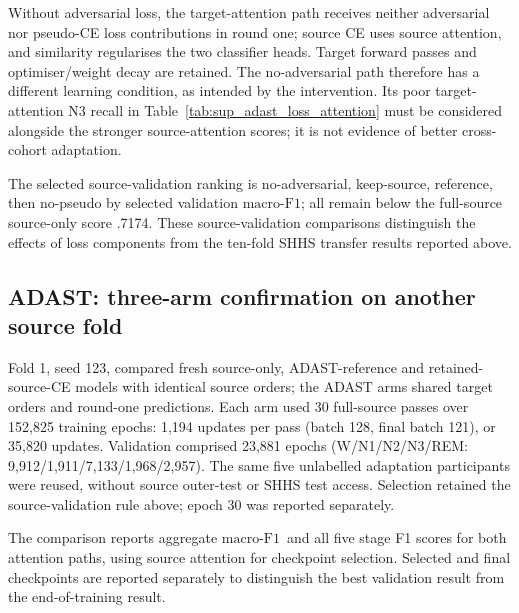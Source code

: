 \documentclass[10pt,a4paper]{article}
\newcommand{\mf}{\ensuremath{\mathrm{macro\text{-}F1}}}
\begin{document}
Without adversarial loss, the target-attention path receives neither adversarial nor pseudo-CE
loss contributions in round one; source CE uses source attention, and similarity regularises
the two classifier heads. Target forward passes and optimiser/weight decay are retained.
The no-adversarial path therefore has a different learning condition, as intended by the
intervention. Its poor target-attention N3 recall in Table~\ref{tab:sup_adast_loss_attention}
must be considered alongside the stronger source-attention scores; it is not evidence of
better cross-cohort adaptation.

The selected source-validation ranking is no-adversarial, keep-source, reference, then no-pseudo by
selected validation \mf; all remain below the full-source source-only score .7174.
These source-validation comparisons distinguish the effects of loss components from
the ten-fold SHHS transfer results reported above.

\subsection*{ADAST: three-arm confirmation on another source fold}

Fold 1, seed 123, compared fresh source-only, ADAST-reference and retained-source-CE
models with identical source orders; the ADAST arms shared target orders and round-one
predictions. Each arm used 30 full-source passes over 152,825 training epochs: 1,194
updates per pass (batch 128, final batch 121), or 35,820 updates. Validation comprised
23,881 epochs (W/N1/N2/N3/REM: 9,912/1,911/7,133/1,968/2,957). The same five unlabelled
adaptation participants were reused, without source outer-test or SHHS test access.
Selection retained the source-validation rule above; epoch 30 was reported separately.

The comparison reports aggregate \mf\ and all five stage F1 scores for both attention
paths, using source attention for checkpoint selection. Selected and final checkpoints
are reported separately to distinguish the best validation result from the end-of-training result.
\end{document}
